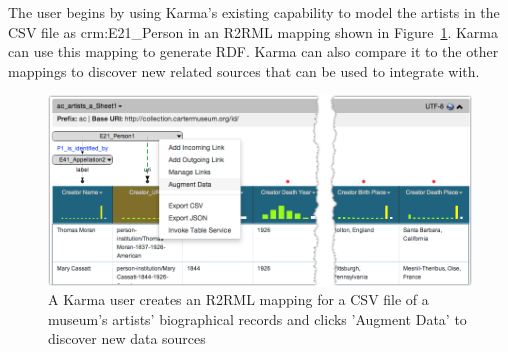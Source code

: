 The user begins by using Karma's existing capability to model the artists in the CSV file as crm:E21\_Person in an R2RML mapping shown in Figure~\ref{fig:simple-model-screenshot}.  
Karma can use this mapping to generate RDF. 
Karma can also compare it to the other mappings to discover new related sources that can be used to integrate with.
\begin{figure}[b]
\centering
\includegraphics[width=4.8in]{images/4-simple-model.png}
\vspace{-20pt}
\caption{A Karma user creates an R2RML mapping for a CSV file of a museum's artists' biographical records and clicks 'Augment Data' to discover new data sources}
\vspace{-21pt}
\label{fig:simple-model-screenshot}
\end{figure}